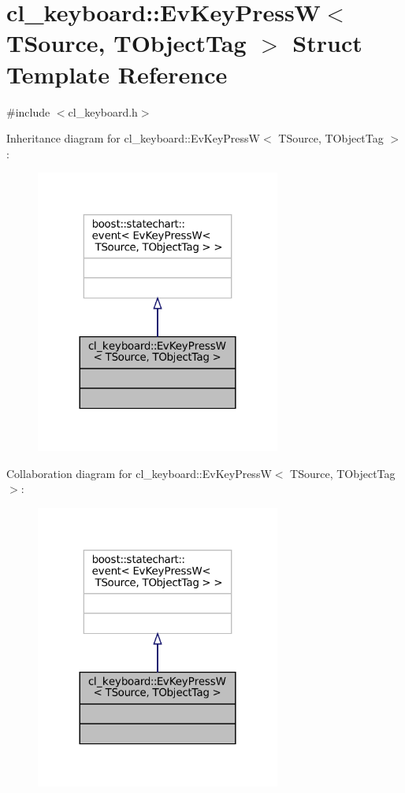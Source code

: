 \hypertarget{structcl__keyboard_1_1EvKeyPressW}{}\section{cl\+\_\+keyboard\+:\+:Ev\+Key\+PressW$<$ T\+Source, T\+Object\+Tag $>$ Struct Template Reference}
\label{structcl__keyboard_1_1EvKeyPressW}


{\ttfamily \#include $<$cl\+\_\+keyboard.\+h$>$}



Inheritance diagram for cl\+\_\+keyboard\+:\+:Ev\+Key\+PressW$<$ T\+Source, T\+Object\+Tag $>$\+:
\nopagebreak
\begin{figure}[H]
\begin{center}
\leavevmode
\includegraphics[width=228pt]{structcl__keyboard_1_1EvKeyPressW__inherit__graph}
\end{center}
\end{figure}


Collaboration diagram for cl\+\_\+keyboard\+:\+:Ev\+Key\+PressW$<$ T\+Source, T\+Object\+Tag $>$\+:
\nopagebreak
\begin{figure}[H]
\begin{center}
\leavevmode
\includegraphics[width=228pt]{structcl__keyboard_1_1EvKeyPressW__coll__graph}
\end{center}
\end{figure}


